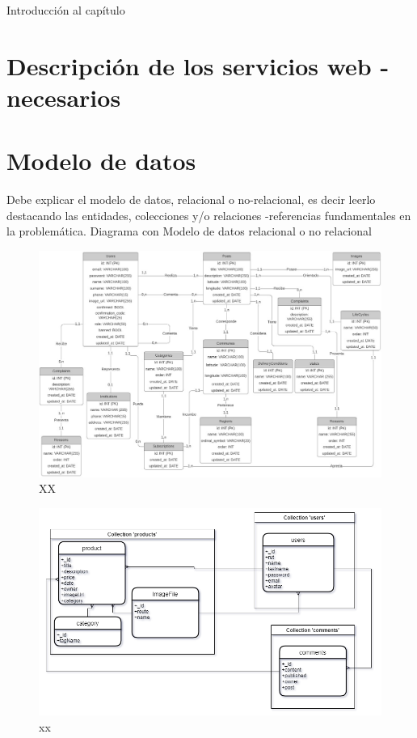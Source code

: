 
Introducción al capítulo

\section{Descripción de los servicios web - necesarios}
\section{Modelo de datos}

Debe explicar el modelo de datos, relacional o no-relacional, es decir leerlo destacando las entidades, colecciones y/o relaciones -referencias fundamentales en la problemática.
Diagrama con Modelo de datos relacional o no relacional

\begin{figure}[H]
    \centering
    \includegraphics[scale=0.5]{figures/i4.jpg}
    \caption{XX}
    \label{fig:i4}
\end{figure}

\begin{figure}[H]
    \centering
    \includegraphics[scale=0.5]{figures/i5.png}
    \caption{xx}
    \label{fig:i5}
\end{figure}

